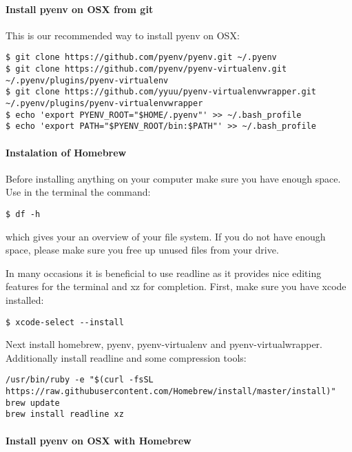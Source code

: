 \paragraph{Install pyenv on OSX from
git}\label{install-pyenv-on-osx-from-git}

This is our recommended way to install pyenv on OSX:

\begin{verbatim}
$ git clone https://github.com/pyenv/pyenv.git ~/.pyenv
$ git clone https://github.com/pyenv/pyenv-virtualenv.git ~/.pyenv/plugins/pyenv-virtualenv
$ git clone https://github.com/yyuu/pyenv-virtualenvwrapper.git ~/.pyenv/plugins/pyenv-virtualenvwrapper
$ echo 'export PYENV_ROOT="$HOME/.pyenv"' >> ~/.bash_profile
$ echo 'export PATH="$PYENV_ROOT/bin:$PATH"' >> ~/.bash_profile
\end{verbatim}

\paragraph{Instalation of Homebrew}\label{instalation-of-homebrew}

Before installing anything on your computer make sure you have enough
space. Use in the terminal the command:

\begin{verbatim}
$ df -h
\end{verbatim}

which gives your an overview of your file system. If you do not have
enough space, please make sure you free up unused files from your drive.

In many occasions it is beneficial to use readline as it provides nice
editing features for the terminal and xz for completion. First, make
sure you have xcode installed:

\begin{verbatim}
$ xcode-select --install
\end{verbatim}

Next install homebrew, pyenv, pyenv-virtualenv and pyenv-virtualwrapper.
Additionally install readline and some compression tools:

\begin{verbatim}
/usr/bin/ruby -e "$(curl -fsSL https://raw.githubusercontent.com/Homebrew/install/master/install)"
brew update
brew install readline xz
\end{verbatim}

\paragraph{Install pyenv on OSX with
Homebrew}\label{install-pyenv-on-osx-with-homebrew}

